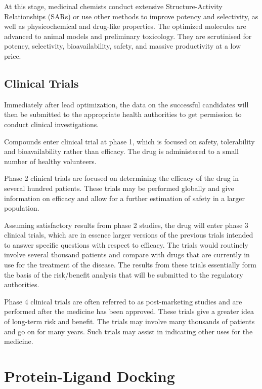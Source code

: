At this stage, medicinal chemists conduct extensive Structure-Activity Relationships (SARs) \citep{328} or use other methods \citep{661,475} to improve potency and selectivity, as well as physicochemical and drug-like properties. The optimized molecules are advanced to animal models and preliminary toxicology. They are scrutinised for potency, selectivity, bioavailability, safety, and massive productivity at a low price.

\subsection{Clinical Trials}

Immediately after lead optimization, the data on the successful candidates will then be submitted to the appropriate health authorities to get permission to conduct clinical investigations.

Compounds enter clinical trial at phase 1, which is focused on safety, tolerability and bioavailability rather than efficacy. The drug is administered to a small number of healthy volunteers.

Phase 2 clinical trials are focused on determining the efficacy of the drug in several hundred patients. These trials may be performed globally and give information on efficacy and allow for a further estimation of safety in a larger population.

Assuming satisfactory results from phase 2 studies, the drug will enter phase 3 clinical trials, which are in essence larger versions of the previous trials intended to answer specific questions with respect to efficacy. The trials would routinely involve several thousand patients and compare with drugs that are currently in use for the treatment of the disease. The results from these trials essentially form the basis of the risk/benefit analysis that will be submitted to the regulatory authorities.

Phase 4 clinical trials are often referred to as post-marketing studies and are performed after the medicine has been approved. These trials give a greater idea of long-term risk and benefit. The trials may involve many thousands of patients and go on for many years. Such trials may assist in indicating other uses for the medicine.

\section{Protein-Ligand Docking}


